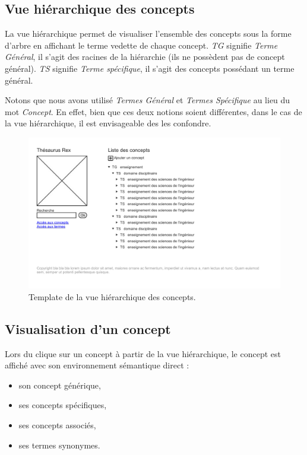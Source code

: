 \subsection{Vue hiérarchique des concepts}

La vue hiérarchique permet de visualiser l'ensemble des concepts sous la forme d'arbre en affichant le terme vedette de chaque concept. \emph{TG} signifie \emph{Terme Général},  il s'agit des racines de la hiérarchie (ils ne possèdent pas de concept général). \emph{TS} signifie \emph{Terme spécifique}, il s'agit des concepts possédant un terme général.

Notons que nous avons utilisé \emph{Termes Général} et \emph{Termes Spécifique} au lieu du mot \emph{Concept}. En effet, bien que ces deux notions soient différentes, dans le cas de la vue hiérarchique, il est envisageable des les confondre.
\begin{figure}[H]
\begin{center}
\includegraphics[width=\textwidth]{files/template_concepts}
\end{center}
\caption{Template de la vue hiérarchique des concepts.}
\end{figure}

\subsection{Visualisation d'un concept}

Lors du clique sur un concept à partir de la vue hiérarchique, le concept est affiché avec son environnement sémantique direct :
\begin{itemize}
\item son concept générique,
\item ses concepts spécifiques,
\item ses concepts associés,
\item ses termes synonymes.
\end{itemize}

